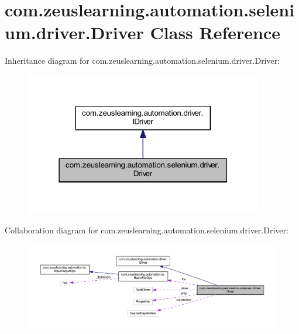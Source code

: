\hypertarget{classcom_1_1zeuslearning_1_1automation_1_1selenium_1_1driver_1_1Driver}{}\section{com.\+zeuslearning.\+automation.\+selenium.\+driver.\+Driver Class Reference}
\label{classcom_1_1zeuslearning_1_1automation_1_1selenium_1_1driver_1_1Driver}


Inheritance diagram for com.\+zeuslearning.\+automation.\+selenium.\+driver.\+Driver\+:\nopagebreak
\begin{figure}[H]
\begin{center}
\leavevmode
\includegraphics[width=295pt]{d0/d8f/classcom_1_1zeuslearning_1_1automation_1_1selenium_1_1driver_1_1Driver__inherit__graph}
\end{center}
\end{figure}


Collaboration diagram for com.\+zeuslearning.\+automation.\+selenium.\+driver.\+Driver\+:\nopagebreak
\begin{figure}[H]
\begin{center}
\leavevmode
\includegraphics[width=350pt]{da/d5f/classcom_1_1zeuslearning_1_1automation_1_1selenium_1_1driver_1_1Driver__coll__graph}
\end{center}
\end{figure}
